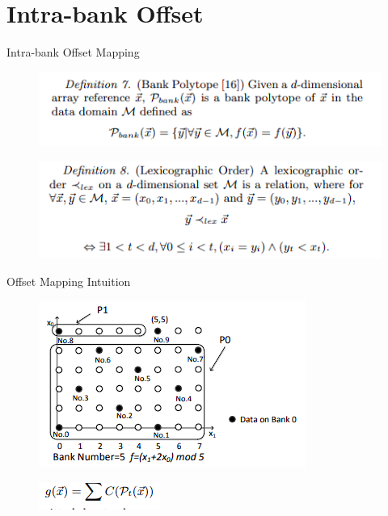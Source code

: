 \documentclass[xcolor=dvipsnames]{beamer}
\begin{document}
    \section{Intra-bank Offset}
    \begin{frame}{Intra-bank Offset Mapping}

        \begin{figure}
            \includegraphics{BankPoly.PNG}
        \end{figure}

        \begin{figure}
            \includegraphics{LexOrder.PNG}
        \end{figure}
        
    \end{frame}

    \begin{frame}{Offset Mapping Intuition}

        \begin{figure}
            \includegraphics{BankMapIntuition.PNG}
        \end{figure}

        \begin{figure}
            \includegraphics{OffsetEq.PNG}
        \end{figure}
        
    \end{frame}
\end{document}
